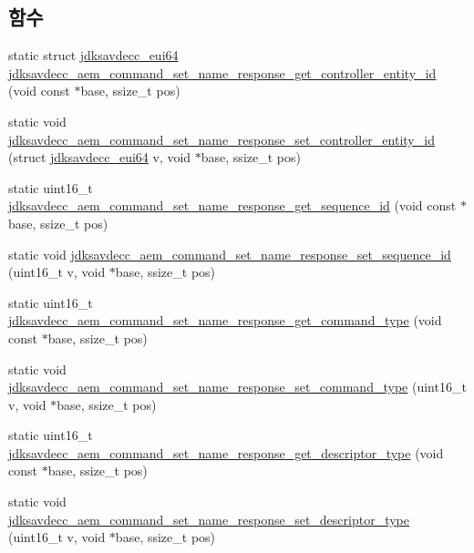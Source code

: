 \subsection*{함수}
\begin{DoxyCompactItemize}
\item 
static struct \hyperlink{structjdksavdecc__eui64}{jdksavdecc\+\_\+eui64} \hyperlink{group__command__set__name__response_ga9104a02f30d2d08aa1b7bffdf4e55c9d}{jdksavdecc\+\_\+aem\+\_\+command\+\_\+set\+\_\+name\+\_\+response\+\_\+get\+\_\+controller\+\_\+entity\+\_\+id} (void const $\ast$base, ssize\+\_\+t pos)
\item 
static void \hyperlink{group__command__set__name__response_ga4e4187317fdbba0b5ca2e45c5bc58d59}{jdksavdecc\+\_\+aem\+\_\+command\+\_\+set\+\_\+name\+\_\+response\+\_\+set\+\_\+controller\+\_\+entity\+\_\+id} (struct \hyperlink{structjdksavdecc__eui64}{jdksavdecc\+\_\+eui64} v, void $\ast$base, ssize\+\_\+t pos)
\item 
static uint16\+\_\+t \hyperlink{group__command__set__name__response_gae7da10e58e290a746e572ea3709c4258}{jdksavdecc\+\_\+aem\+\_\+command\+\_\+set\+\_\+name\+\_\+response\+\_\+get\+\_\+sequence\+\_\+id} (void const $\ast$base, ssize\+\_\+t pos)
\item 
static void \hyperlink{group__command__set__name__response_ga9e266313aeee4b9116a5f181eaa13159}{jdksavdecc\+\_\+aem\+\_\+command\+\_\+set\+\_\+name\+\_\+response\+\_\+set\+\_\+sequence\+\_\+id} (uint16\+\_\+t v, void $\ast$base, ssize\+\_\+t pos)
\item 
static uint16\+\_\+t \hyperlink{group__command__set__name__response_ga2bd961918b59e649d28f04b381d3ebc6}{jdksavdecc\+\_\+aem\+\_\+command\+\_\+set\+\_\+name\+\_\+response\+\_\+get\+\_\+command\+\_\+type} (void const $\ast$base, ssize\+\_\+t pos)
\item 
static void \hyperlink{group__command__set__name__response_gae8218aed4eb09c755fbb5c94ec385b75}{jdksavdecc\+\_\+aem\+\_\+command\+\_\+set\+\_\+name\+\_\+response\+\_\+set\+\_\+command\+\_\+type} (uint16\+\_\+t v, void $\ast$base, ssize\+\_\+t pos)
\item 
static uint16\+\_\+t \hyperlink{group__command__set__name__response_ga3a95f51790a717c477cf1729aa02306e}{jdksavdecc\+\_\+aem\+\_\+command\+\_\+set\+\_\+name\+\_\+response\+\_\+get\+\_\+descriptor\+\_\+type} (void const $\ast$base, ssize\+\_\+t pos)
\item 
static void \hyperlink{group__command__set__name__response_ga393325f18f5a7fb3e8e94ee3ce916564}{jdksavdecc\+\_\+aem\+\_\+command\+\_\+set\+\_\+name\+\_\+response\+\_\+set\+\_\+descriptor\+\_\+type} (uint16\+\_\+t v, void $\ast$base, ssize\+\_\+t pos)

\end{DoxyCompactItemize}
